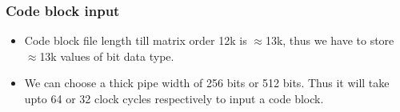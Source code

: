 \documentclass[xcolor=dvipsname]
{beamer}
\begin{document}
\begin{frame}[t]
\frametitle{ Code block input }  
\begin{itemize}
\item Code block file length till matrix order 12k is $\approx$13k, thus we have to store $\approx$13k values of bit data type.
\item We can choose a thick pipe width of 256 bits or 512 bits. Thus it will take upto 64 or 32 clock cycles respectively to input a code block.
\end{itemize}
\end{frame}

\end{document}

